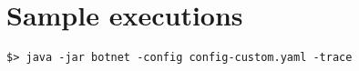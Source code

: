 \section{Sample executions}
\label{sec:sample-executions}

\lipsum[1]

\begin{verbatim}
$> java -jar botnet -config config-custom.yaml -trace
\end{verbatim}

\lipsum[1]
